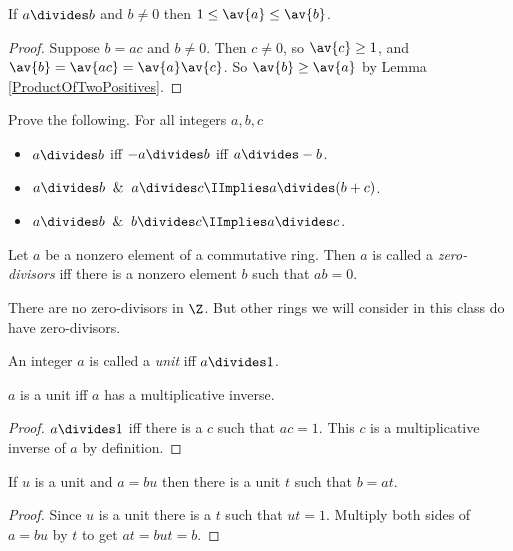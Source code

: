 \documentclass[oneside,12pt]{amsart}
\begin{document}
\begin{lemma}
If $a\divides b$ and $b\not=0$ then $1 \leq \av{a} \leq \av{b}$.
\end{lemma}
\begin{proof}
Suppose $b=ac$ and $b\not=0$. Then $c\not=0$, so $\av{c}\geq 1$, and
$\av{b} = \av{ac} = \av{a}\av{c}$. So $\av{b} \geq \av{a}$ by Lemma
\ref{ProductOfTwoPositives}.
\end{proof}

\begin{homework}
Prove the following. For all integers $a,b,c$
\begin{itemize}
\item $a\divides b$ iff $-a\divides b$ iff $a\divides -b$.
\item $a\divides b \And a\divides c \IImplies a\divides (b+c)$.
\item $a\divides b \And b\divides c \IImplies  a\divides c$.
\end{itemize}
\end{homework}

\begin{definition}
Let $a$ be a nonzero element of a commutative ring. Then $a$ is called a
\emph{zero-divisors} iff there is a nonzero element $b$ such that $ab=0$.
\end{definition}

There are no zero-divisors in $\Z$. But other rings we will consider in this
class do have zero-divisors.

\begin{definition}
An integer $a$ is called a \emph{unit} iff $a\divides 1$.
\end{definition}

\begin{lemma}
$a$ is a unit iff $a$ has a multiplicative inverse.
\end{lemma}
\begin{proof}
$a\divides 1$ iff there is a $c$ such that $ac=1$. This $c$ is a multiplicative
inverse of $a$ by definition.
\end{proof}

\begin{lemma}
If $u$ is a unit and $a=bu$ then there is a unit $t$ such that $b=at$.
\end{lemma}
\begin{proof}
Since $u$ is a unit there is a $t$ such that $ut=1$. Multiply both sides
of $a=bu$ by $t$ to get $at=but=b$.
\end{proof}
\end{document}
